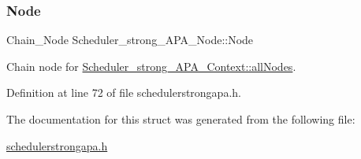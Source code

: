 \subsubsection{\texorpdfstring{Node}{Node}}
{\footnotesize\ttfamily Chain\+\_\+\+Node Scheduler\+\_\+strong\+\_\+\+A\+P\+A\+\_\+\+Node\+::\+Node}



Chain node for \hyperlink{structScheduler__strong__APA__Context_ad850b98c29b7ab48bb7aff1a941fb331}{Scheduler\+\_\+strong\+\_\+\+A\+P\+A\+\_\+\+Context\+::all\+Nodes}. 



Definition at line 72 of file schedulerstrongapa.\+h.



The documentation for this struct was generated from the following file\+:\begin{DoxyCompactItemize}
\item 
\hyperlink{schedulerstrongapa_8h}{schedulerstrongapa.\+h}\end{DoxyCompactItemize}

